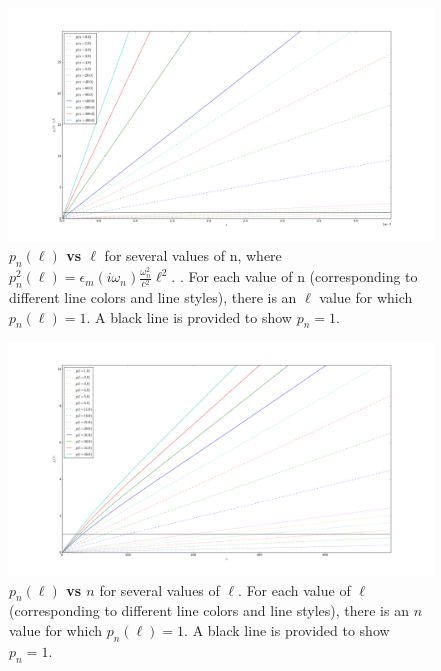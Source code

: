 \documentclass[a4paper]{article}
\begin{document}
\begin{center}
\begin{figure}[t!]
\begin{center}
\includegraphics[width=1.2\textwidth,scale=0.5]{plots/pn_vs_l.png}
\hskip 43pt
\caption{{\bf $p_n(\ell)$ vs $\ell$} for several values of n, where $p_n^{2}(\ell) =  \epsilon_m(i \omega_n) \frac{\omega_n^{2}}{c^{2}} \ell^{2}$. .  For each value of n (corresponding to different line colors and line styles), there is an $\ell$ value for which $p_n(\ell)=1$.  A black line is provided to show $p_n=1$.}
\label{eiz65}
\end{center}
\end{figure} 
\hskip 73pt

\begin{figure}[t!]
\begin{center}
\includegraphics[width=1.2\textwidth,scale=0.5]{plots/pn_vs_n.png}
\hskip 43pt
\caption{{\bf $p_n(\ell)$ vs $n$} for several values of $\ell$.  For each value of
    $\ell$ (corresponding to different line colors and line styles),
there is an $n$ value for which $p_n(\ell)=1$.  A black line is provided
to show $p_n=1$.}
\label{eiz65}
\end{center}
\end{figure} 


\end{center}
\end{document}
